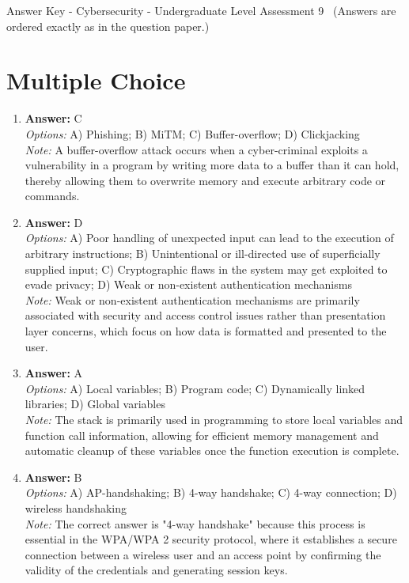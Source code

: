 \documentclass[12pt]{article}
\begin{document}
\begin{center}
Answer Key - Cybersecurity - Undergraduate Level Assessment 9 \
\small (Answers are ordered exactly as in the question paper.)
\end{center}

\section*{Multiple Choice}
\begin{enumerate}[label=\arabic*.]
\item \textbf{Answer:} C
\\ \textit{Options:} A) Phishing; B) MiTM; C) Buffer-overflow; D) Clickjacking
\\ \textit{Note:} A buffer-overflow attack occurs when a cyber-criminal exploits a vulnerability in a program by writing more data to a buffer than it can hold, thereby allowing them to overwrite memory and execute arbitrary code or commands.
\item \textbf{Answer:} D
\\ \textit{Options:} A) Poor handling of unexpected input can lead to the execution of arbitrary instructions; B) Unintentional or ill-directed use of superficially supplied input; C) Cryptographic flaws in the system may get exploited to evade privacy; D) Weak or non-existent authentication mechanisms
\\ \textit{Note:} Weak or non-existent authentication mechanisms are primarily associated with security and access control issues rather than presentation layer concerns, which focus on how data is formatted and presented to the user.
\item \textbf{Answer:} A
\\ \textit{Options:} A) Local variables; B) Program code; C) Dynamically linked libraries; D) Global variables
\\ \textit{Note:} The stack is primarily used in programming to store local variables and function call information, allowing for efficient memory management and automatic cleanup of these variables once the function execution is complete.
\item \textbf{Answer:} B
\\ \textit{Options:} A) AP-handshaking; B) 4-way handshake; C) 4-way connection; D) wireless handshaking
\\ \textit{Note:} The correct answer is "4-way handshake" because this process is essential in the WPA/WPA 2 security protocol, where it establishes a secure connection between a wireless user and an access point by confirming the validity of the credentials and generating session keys.

\end{enumerate}
\end{document}
